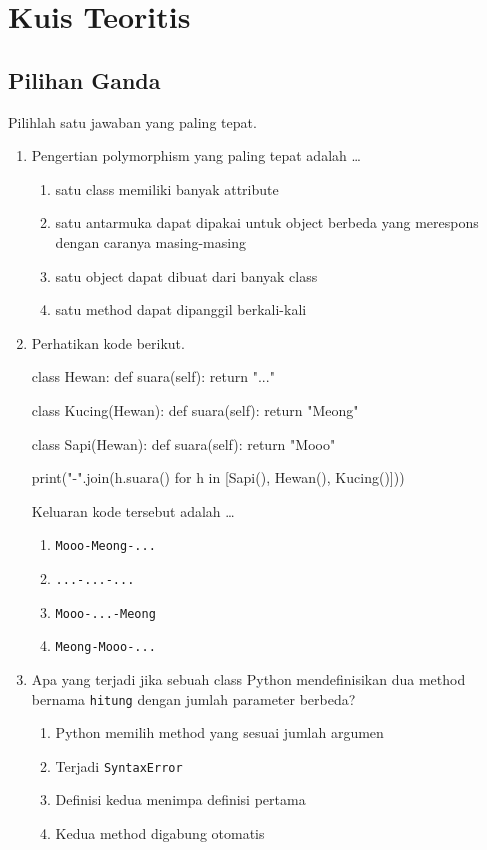 \section{Kuis Teoritis}

\subsection{Pilihan Ganda}

Pilihlah satu jawaban yang paling tepat.

\begin{enumerate}
  \item Pengertian polymorphism yang paling tepat adalah \ldots
  \begin{enumerate}[label=\alph*.,itemsep=0pt]
    \item satu class memiliki banyak attribute
    \item satu antarmuka dapat dipakai untuk object berbeda yang merespons dengan caranya masing-masing
    \item satu object dapat dibuat dari banyak class
    \item satu method dapat dipanggil berkali-kali
  \end{enumerate}

  \item Perhatikan kode berikut.
\begin{kode}[Soal 2]
class Hewan:
    def suara(self):
        return "..."

class Kucing(Hewan):
    def suara(self):
        return "Meong"

class Sapi(Hewan):
    def suara(self):
        return "Mooo"

print("-".join(h.suara() for h in [Sapi(), Hewan(), Kucing()]))
\end{kode}
  Keluaran kode tersebut adalah \ldots
  \begin{enumerate}[label=\alph*.,itemsep=0pt]
    \item \texttt{Mooo-Meong-...}
    \item \texttt{...-...-...}
    \item \texttt{Mooo-...-Meong}
    \item \texttt{Meong-Mooo-...}
  \end{enumerate}

  \item Apa yang terjadi jika sebuah class Python mendefinisikan dua method bernama \texttt{hitung} dengan jumlah parameter berbeda?
  \begin{enumerate}[label=\alph*.,itemsep=0pt]
    \item Python memilih method yang sesuai jumlah argumen
    \item Terjadi \texttt{SyntaxError}
    \item Definisi kedua menimpa definisi pertama
    \item Kedua method digabung otomatis
  \end{enumerate}


\end{enumerate}
